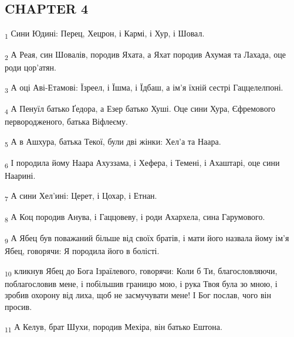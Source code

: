 \subsection{CHAPTER 4}
\begin{tcolorbox}
\textsubscript{1} Сини Юдині: Перец, Хецрон, і Кармі, і Хур, і Шовал.
\end{tcolorbox}
\begin{tcolorbox}
\textsubscript{2} А Реая, син Шовалів, породив Яхата, а Яхат породив Ахумая та Лахада, оце роди цор'атян.
\end{tcolorbox}
\begin{tcolorbox}
\textsubscript{3} А оці Аві-Етамові: Їзреел, і Їшма, і Їдбаш, а ім'я їхній сестрі Гаццелелпоні.
\end{tcolorbox}
\begin{tcolorbox}
\textsubscript{4} А Пенуїл батько Ґедора, а Езер батько Хуші. Оце сини Хура, Єфремового первородженого, батька Віфлеєму.
\end{tcolorbox}
\begin{tcolorbox}
\textsubscript{5} А в Ашхура, батька Текої, були дві жінки: Хел'а та Наара.
\end{tcolorbox}
\begin{tcolorbox}
\textsubscript{6} І породила йому Наара Ахуззама, і Хефера, і Темені, і Ахаштарі, оце сини Наарині.
\end{tcolorbox}
\begin{tcolorbox}
\textsubscript{7} А сини Хел'ині: Церет, і Цохар, і Етнан.
\end{tcolorbox}
\begin{tcolorbox}
\textsubscript{8} А Коц породив Анува, і Гаццовеву, і роди Ахархела, сина Гарумового.
\end{tcolorbox}
\begin{tcolorbox}
\textsubscript{9} А Ябец був поважаний більше від своїх братів, і мати його назвала йому ім'я Ябец, говорячи: Я породила його в болісті.
\end{tcolorbox}
\begin{tcolorbox}
\textsubscript{10} кликнув Ябец до Бога Ізраїлевого, говорячи: Коли б Ти, благословляючи, поблагословив мене, і побільшив границю мою, і рука Твоя була зо мною, і зробив охорону від лиха, щоб не засмучувати мене! І Бог послав, чого він просив.
\end{tcolorbox}
\begin{tcolorbox}
\textsubscript{11} А Келув, брат Шухи, породив Мехіра, він батько Ештона.
\end{tcolorbox}
